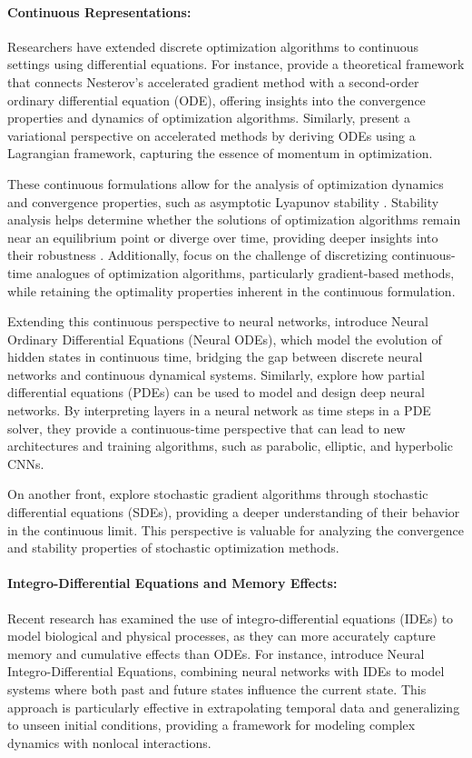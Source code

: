 \documentclass{article} %
\begin{document}
\paragraph{Continuous Representations:}
Researchers have extended discrete optimization algorithms to continuous settings using differential equations. For instance, \cite{Su2016} provide a theoretical framework that connects Nesterov's accelerated gradient method with a second-order ordinary differential equation (ODE), offering insights into the convergence properties and dynamics of optimization algorithms. Similarly, \cite{Wibisono2016} present a variational perspective on accelerated methods by deriving ODEs using a Lagrangian framework, capturing the essence of momentum in optimization.

These continuous formulations allow for the analysis of optimization dynamics and convergence properties, such as asymptotic Lyapunov stability \cite{gantmakher1970lectures}. Stability analysis helps determine whether the solutions of optimization algorithms remain near an equilibrium point or diverge over time, providing deeper insights into their robustness \cite{Khalil2002}. Additionally,  \cite{Romero2022} focus on the challenge of discretizing continuous-time analogues of optimization algorithms, particularly gradient-based methods, while retaining the optimality properties inherent in the continuous formulation.

Extending this continuous perspective to neural networks,  \cite{chen2018neural} introduce Neural Ordinary Differential Equations (Neural ODEs), which model the evolution of hidden states in continuous time, bridging the gap between discrete neural networks and continuous dynamical systems. Similarly, \cite{ruthotto2020deep} explore how partial differential equations (PDEs) can be used to model and design deep neural networks. By interpreting layers in a neural network as time steps in a PDE solver, they provide a continuous-time perspective that can lead to new architectures and training algorithms, such as parabolic, elliptic, and hyperbolic CNNs.

On another front, \cite{li2017stochastic} explore stochastic gradient algorithms through stochastic differential equations (SDEs), providing a deeper understanding of their behavior in the continuous limit. This perspective is valuable for analyzing the convergence and stability properties of stochastic optimization methods.

\paragraph{Integro-Differential Equations and Memory Effects:}
Recent research has examined the use of integro-differential equations (IDEs) to model biological and physical processes, as they can more accurately capture memory and cumulative effects than ODEs. For instance, \cite{zappala2022neural} introduce Neural Integro-Differential Equations, combining neural networks with IDEs to model systems where both past and future states influence the current state. This approach is particularly effective in extrapolating temporal data and generalizing to unseen initial conditions, providing a framework for modeling complex dynamics with nonlocal interactions.
\end{document}
